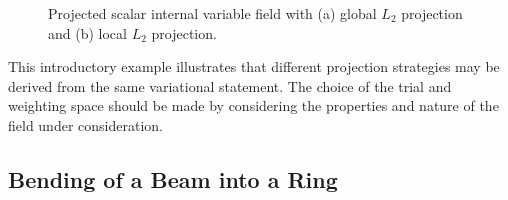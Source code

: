 \documentclass[12pt]{article}
\begin{document}
\begin{figure}[htbp]
  \begin{center}
    \unitlength=1.0mm
    \caption{Projected scalar internal variable field with (a) global
      $L_2$ projection and (b) local $L_2$ projection.}
    \label{fig:example-cube}
  \end{center}
\end{figure}

This introductory example illustrates that different projection
strategies may be derived from the same variational statement. The
choice of the trial and weighting space should be made by considering
the properties and nature of the field under consideration.

\subsection{Bending of a Beam into a Ring}
\end{document}
